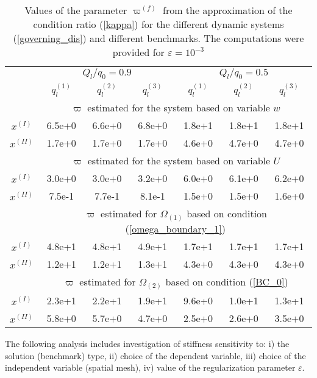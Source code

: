 \begin{table}[h*]
\centering
\begin{tabular}{c| c@{}|c@{}|c@{}|c@{}|c@{}|c@{}|}
\cline{2-7}
& \multicolumn{3}{c|}{$Q_l/q_0=0.9$} & \multicolumn{3}{c|}{$Q_l/q_0=0.5$} \\ \cline{2-7}
& $q_l^{(1)}$ & $q_l^{(2)}$ & $q_l^{(3)}$ & $q_l^{(1)}$ & $q_l^{(2)}$ & $q_l^{(3)}$\\ \cline{2-7}
& \multicolumn{6}{c|}{$\varpi$ estimated for the system based on variable $w$}\\ \cline{1-7}
\multicolumn{1}{|c|}{$x^{(I)}$}
&6.5e+0&6.6e+0&6.8e+0&1.8e+1&1.8e+1&1.8e+1 \\ \cline{1-7} \multicolumn{1}{|c|}{$x^{(II)}$}
&1.7e+0&1.7e+0&1.7e+0&4.6e+0&4.7e+0&4.7e+0
  \\ \cline{1-7}
& \multicolumn{6}{c|}{$\varpi$ estimated for the system based on variable $U$ }\\ \cline{1-7}
\multicolumn{1}{|c|}{$x^{(I)}$} &3.0e+0&3.0e+0&3.2e+0&6.0e+0&6.1e+0&6.2e+0 \\ \cline{1-7} \multicolumn{1}{|c|}{$x^{(II)}$}
&7.5e-1&7.7e-1&8.1e-1&1.5e+0&1.5e+0&1.6e+0
  \\ \cline{1-7}
& \multicolumn{6}{c|}{$\varpi$ estimated for $\Omega_{(1)}$ based on  condition (\ref{omega_boundary_1})}\\ \cline{1-7}
\multicolumn{1}{|c|}{$x^{(I)}$}
&4.8e+1&4.8e+1&4.9e+1&1.7e+1&1.7e+1&1.7e+1 \\ \cline{1-7} \multicolumn{1}{|c|}{$x^{(II)}$}
&1.2e+1&1.2e+1&1.3e+1&4.3e+0&4.3e+0&4.3e+0
  \\ \cline{1-7}
& \multicolumn{6}{c|}{$\varpi$ estimated for $\Omega_{(2)}$ based on condition (\ref{BC_0})}\\ \cline{1-7}
\multicolumn{1}{|c|}{$x^{(I)}$}
&2.3e+1&2.2e+1&1.9e+1&9.6e+0&1.0e+1&1.3e+1 \\ \cline{1-7} \multicolumn{1}{|c|}{$x^{(II)}$}
&5.8e+0&5.7e+0&4.7e+0&2.5e+0&2.6e+0&3.5e+0
  \\ \cline{1-7}
\end{tabular}
\caption{Values of the parameter $\varpi^{(f)}$ from the
approximation of the condition ratio (\ref{kappa}) for the different
dynamic systems (\ref{governing_dis}) and different benchmarks. The computations were provided for $\varepsilon =10^{-3}$} \label{table_A}
\end{table}

\vspace{-4mm}

The following analysis includes investigation of stiffness
sensitivity to: i) the solution (benchmark) type, ii) choice of the
dependent variable, iii) choice of the independent variable
(spatial mesh), iv) value of the regularization parameter
$\varepsilon$.




